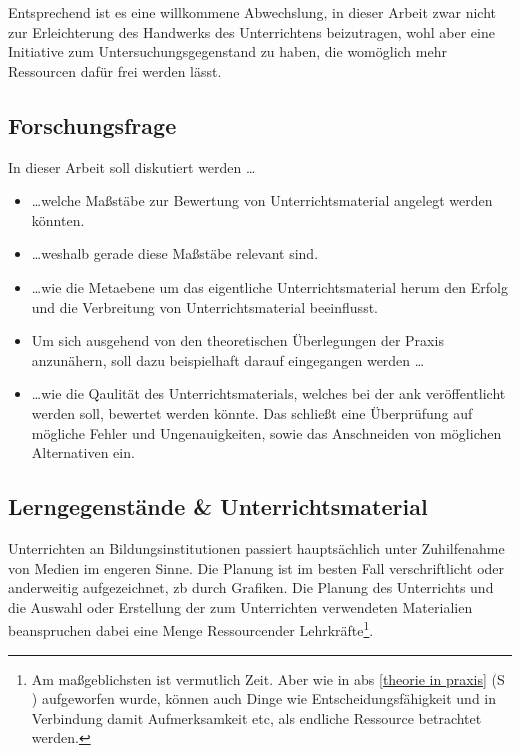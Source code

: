 

Entsprechend ist es eine willkommene Abwechslung, in dieser Arbeit zwar nicht zur Erleichterung des Handwerks des Unterrichtens beizutragen, wohl aber eine Initiative zum Untersuchungsgegenstand zu haben, die womöglich mehr Ressourcen dafür frei werden lässt. 



\subsection{Forschungsfrage}
In dieser Arbeit soll diskutiert werden \dots %
\begin{itemize}
    \item \dots welche Maßstäbe zur Bewertung von Unterrichtsmaterial angelegt werden könnten. 
    \item \dots weshalb gerade diese Maßstäbe relevant sind. 
    \item \dots wie die Metaebene um das eigentliche Unterrichtsmaterial herum den Erfolg und die Verbreitung von Unterrichtsmaterial beeinflusst.
    \item[] Um sich ausgehend von den theoretischen Überlegungen der Praxis anzunähern, soll dazu beispielhaft darauf eingegangen werden \dots
    \item \dots wie die Qaulität des Unterrichtsmaterials, welches bei der \acrlong{ank} veröffentlicht werden soll, bewertet werden könnte. Das schließt eine Überprüfung auf mögliche Fehler und Ungenauigkeiten, sowie das Anschneiden von möglichen Alternativen ein. 
\end{itemize}




\subsection{Lerngegenstände \& Unterrichtsmaterial}
Unterrichten an Bildungsinstitutionen passiert hauptsächlich unter Zuhilfenahme von Medien im engeren Sinne. Die Planung ist im besten Fall verschriftlicht oder anderweitig aufgezeichnet, \gls{zb} durch Grafiken. Die Planung des Unterrichts und die Auswahl oder Erstellung der zum Unterrichten verwendeten Materialien beanspruchen dabei eine Menge Ressourcender Lehrkräfte\footnote{
    Am maßgeblichsten ist vermutlich Zeit. Aber wie in \gls{abs} \ref{theorie in praxis} (\gls{S} \pageref{theorie in praxis}) aufgeworfen wurde, können auch Dinge wie Entscheidungsfähigkeit und in Verbindung damit Aufmerksamkeit \gls{etc}, als endliche Ressource betrachtet werden. 
}. %

